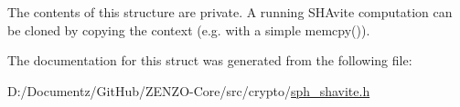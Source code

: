 The contents of this structure are private. A running S\+H\+Avite computation can be cloned by copying the context (e.\+g. with a simple {\ttfamily memcpy()}). 

The documentation for this struct was generated from the following file\+:\begin{DoxyCompactItemize}
\item 
D\+:/\+Documentz/\+Git\+Hub/\+Z\+E\+N\+Z\+O-\/\+Core/src/crypto/\mbox{\hyperlink{sph__shavite_8h}{sph\+\_\+shavite.\+h}}\end{DoxyCompactItemize}
